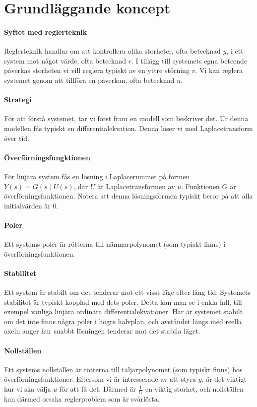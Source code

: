 \section{Grundläggande koncept}

\paragraph{Syftet med reglerteknik}
Reglerteknik handlar om att kontrollera olika storheter, ofta betecknad $y$, i ett system mot något värde, ofta betecknad $r$. I tillägg till systemets egna beteende påverkas storheten vi vill reglera typiskt av en yttre störning $v$. Vi kan reglera systemet genom att tillföra en påverkan, ofta betecknad $u$.

\paragraph{Strategi}
För att förstå systemet, tar vi först fram en modell som beskriver det. Ur denna modellen fås typiskt en differentialekvation. Denna löser vi med Laplacetransform över tid.

\paragraph{Överförningsfungktionen}
För linjära system fås en lösning i Laplacerummet på formen $Y(s) = G(s)U(s)$, där $U$ är Laplacetransformen av $u$. Funktionen $G$ är överförningsfunktionen. Notera att denna lösningsformen typiskt beror på att alla initialvärden är $0$.

\paragraph{Poler}
Ett systems poler är rötterna till nämnarpolynomet (som typiskt finns) i överförningsfunktionen.

\paragraph{Stabilitet}
Ett system är stabilt om det tenderar mot ett visst läge efter lång tid. Systemets stabilitet är typiskt kopplad med dets poler. Detta kan man se i enkla fall, till exempel vanliga linjära ordinära differentialekvationer. Här är systemet stabilt om det inte finns några poler i högre halvplan, och avståndet längs med reella axeln anger hur snabbt lösningen tenderar mot det stabila läget.

\paragraph{Nollställen}
Ett systems nollställen är rötterna till täljarpolynomet (som typiskt finns) hos överförningsfunktioner. Eftersom vi är intresserade av att styra $y$, är det viktigt hur vi ska välja $u$ för att få det. Därmed är $\frac{1}{G}$ en viktig storhet, och nollställen kan därmed orsaka reglerproblem som är svårlösta.

